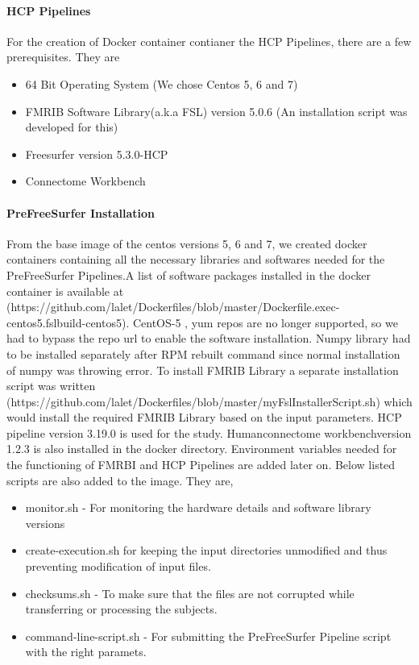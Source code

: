 \documentclass{article}
\begin{document}
\paragraph{HCP Pipelines}

For the creation of Docker container contianer the HCP Pipelines, there are a few prerequisites. They are

\begin{itemize}
  \item 64 Bit Operating System (We chose Centos 5, 6 and 7)
  \item FMRIB Software Library(a.k.a FSL) version 5.0.6 (An installation script was developed for this)
  \item Freesurfer version 5.3.0-HCP
  \item Connectome Workbench
\end{itemize}

\paragraph{PreFreeSurfer Installation}
From the base image of the centos versions 5, 6 and 7, we created docker containers containing all the necessary libraries and softwares needed for the PreFreeSurfer Pipelines.A list of software packages installed in the docker container is available at (https://github.com/lalet/Dockerfiles/blob/master/Dockerfile.exec-centos5.fslbuild-centos5). CentOS-5 , yum repos are no longer supported, so we had to bypass the repo url to enable the software installation. Numpy library had to be installed separately after RPM rebuilt command since normal installation of numpy was throwing error. To install FMRIB Library a separate installation script was written (https://github.com/lalet/Dockerfiles/blob/master/myFslInstallerScript.sh) which would install the required FMRIB Library based on the input parameters. HCP pipeline version 3.19.0 is used for the study. Humanconnectome workbenchversion 1.2.3 is also installed in the docker directory. Environment variables needed for the functioning of FMRBI and HCP Pipelines are added later on.
Below listed scripts are also added to the image. They are,
\begin{itemize}
  \item monitor.sh - For monitoring the hardware details and software library versions
  \item create-execution.sh for keeping the input directories unmodified and thus preventing modification of input files.
  \item checksums.sh - To make sure that the files are not corrupted while transferring or processing the subjects.
  \item command-line-script.sh - For submitting the PreFreeSurfer Pipeline script with the right paramets.
\end{itemize}
\end{document}
